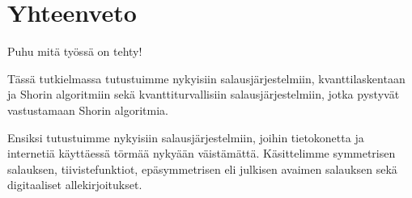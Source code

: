 \chapter{Yhteenveto\label{conclusions}}
Puhu mitä työssä on tehty!

Tässä tutkielmassa tutustuimme nykyisiin salausjärjestelmiin, kvanttilaskentaan ja Shorin algoritmiin sekä kvanttiturvallisiin salausjärjestelmiin, jotka pystyvät vastustamaan Shorin algoritmia.

Ensiksi tutustuimme nykyisiin salausjärjestelmiin, joihin tietokonetta ja internetiä käyttäessä törmää nykyään väistämättä. Käsittelimme symmetrisen salauksen, tiivistefunktiot, epäsymmetrisen eli julkisen avaimen salauksen sekä digitaaliset allekirjoitukset.